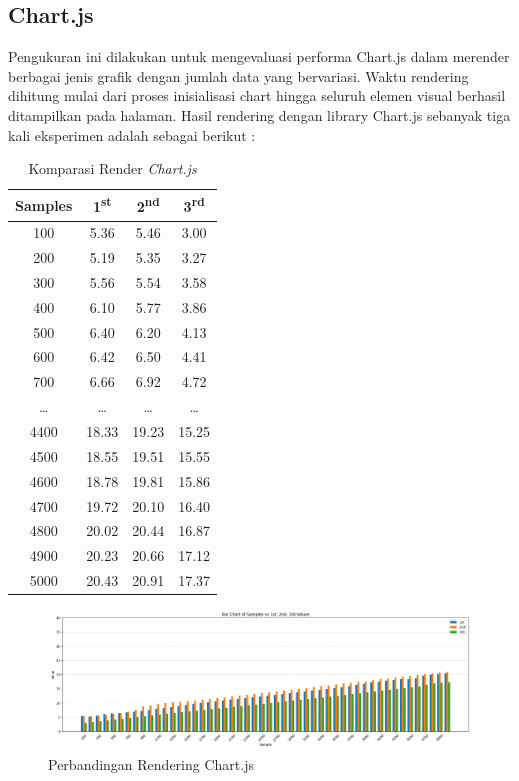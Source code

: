 \subsection{Chart.js}
Pengukuran ini dilakukan untuk mengevaluasi performa Chart.js dalam merender berbagai jenis grafik dengan jumlah data yang bervariasi. Waktu rendering dihitung mulai dari proses inisialisasi chart hingga seluruh elemen visual berhasil ditampilkan pada halaman. Hasil rendering dengan library Chart.js sebanyak tiga kali eksperimen adalah sebagai berikut :

\begin{table}[h!]
	\centering
	\caption{Komparasi Render \textit{Chart.js}}
	\label{tab:komparasi_chartjs}
	\renewcommand{\arraystretch}{1.2}
	\begin{tabular}{|c|c|c|c|}
		\hline
		\textbf{Samples} & \textbf{1\textsuperscript{st}} & \textbf{2\textsuperscript{nd}} & \textbf{3\textsuperscript{rd}} \\
		\hline
		100 & 5.36 & 5.46 & 3.00 \\
		200 & 5.19 & 5.35 & 3.27 \\
		300 & 5.56 & 5.54 & 3.58 \\
		400 & 6.10 & 5.77 & 3.86 \\
		500 & 6.40 & 6.20 & 4.13 \\
		600 & 6.42 & 6.50 & 4.41 \\
		700 & 6.66 & 6.92 & 4.72 \\
		\ldots & \ldots & \ldots & \ldots \\
		4400 & 18.33 & 19.23 & 15.25 \\
		4500 & 18.55 & 19.51 & 15.55 \\
		4600 & 18.78 & 19.81 & 15.86 \\
		4700 & 19.72 & 20.10 & 16.40 \\
		4800 & 20.02 & 20.44 & 16.87 \\
		4900 & 20.23 & 20.66 & 17.12 \\
		5000 & 20.43 & 20.91 & 17.37 \\
		\hline
	\end{tabular}
\end{table}

 	\begin{figure}[H]
	\centering
	\includegraphics[width=0.8\linewidth]{gambar/Pembahasan/FIX_Render/render chart js_fix.png}
	\caption{Perbandingan Rendering Chart.js}
	\label{Perbandingan Rendering Chart.js}
\end{figure}


